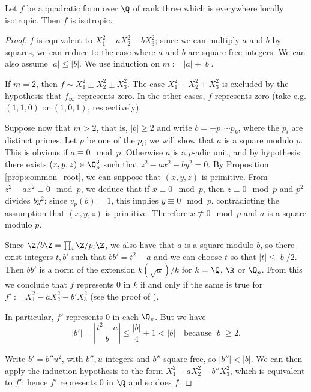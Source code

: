 \begin{lemma}\label{lem:isotr_of_rk_three}
	\leanok
	Let $f$ be a quadratic form over $\Q$ of rank three which is everywhere locally isotropic. Then $f$ is isotropic.
\end{lemma}
\begin{proof}
$f$ is equivalent to $X_1^2 - a X_2^2 - b X_3^2$; since we can multiply $a$ and $b$ by squares, we can reduce to the case where $a$ and $b$ are square-free integers. We can also assume $|a| \le |b|$. We use induction on $m := |a| + |b|$. 

If $m = 2$, then $f \sim X_1^2 \pm X_2^2 \pm X_3^2$. The case $X_1^2 + X_2^2 + X_3^2$ is excluded by the hypothesis that $f_\infty$ represents zero. In the other cases, $f$ represents zero (take e.g. $(1, 1, 0)$ or $(1, 0, 1)$, respectively).

Suppose now that $m > 2$, that is, $|b| \ge 2$ and write $b = \pm p_1 \cdots p_k$, where the $p_i$ are distinct primes. Let $p$ be one of the $p_i$; we will show that $a$ is a square modulo $p$. This is obvious if $a \equiv 0 \mod p$. Otherwise $a$ is a $p$-adic unit, and by hypothesis there exists $(x, y, z) \in \Q_p^3$ such that $z^2 - ax^2 - by^2 = 0$. By Proposition \ref{prop:common_root}, we can suppose that $(x, y, z)$ is primitive.
From $z^2 - a x^2 \equiv 0 \mod p$, we deduce that if $x \equiv 0 \mod p$, then $z \equiv 0 \mod p$ and $p^2$ divides $by^2$; since $v_p(b) = 1$, this implies $y \equiv 0 \mod p$, contradicting the assumption that $(x, y, z)$ is primitive. Therefore $x \not\equiv 0 \mod p$ and $a$ is a square modulo $p$.

Since $\Z / b\Z = \prod_i \Z / p_i \Z$, we also have that $a$ is a square modulo $b$, so there exist integers $t, b'$ such that $bb' = t^2 - a$ and we can choose $t$ so that $|t| \le |b|/2$. Then $bb'$ is a norm of the extension $k(\sqrt{a})/k$ for $k = \Q$, $\R$ or $\Q_p$. From this we conclude that $f$ represents $0$ in $k$ if and only if the same is true for $f' := X_1^2 - a X_2^2 - b' X_3^2$ (see the proof of \cite[\S III.1.1, Proposition 1]{Ser73}).

In particular, $f'$ represents $0$ in each $\Q_v$. But we have 
\[ |b'| = \left | \frac{t^2 - a}{b} \right | \le \frac{|b|}{4} + 1 < |b| \quad \text{because } |b| \ge 2.  \]

Write $b' = b'' u^2$, with $b'', u$ integers and $b''$ square-free, so $|b''| < |b|$. We can then apply the induction hypothesis to the form $X_1^2 - a X_2^2 - b'' X_3^2$, which is equivalent to $f'$; hence $f'$ represents $0$ in $\Q$ and so does $f$.
\end{proof}

